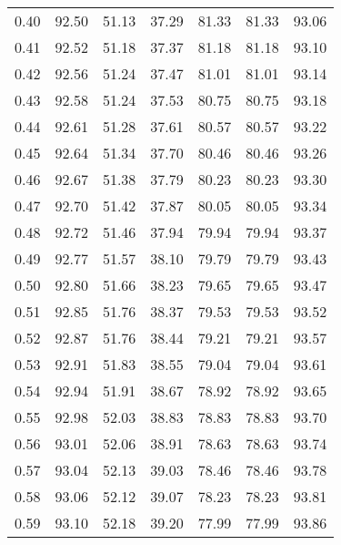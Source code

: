 \begin{tabular}{|c|c|c|c|c|c|c|}
      0.40 &     92.50 &     51.13 &      37.29 &   81.33 &      81.33 &         93.06 \\
      0.41 &     92.52 &     51.18 &      37.37 &   81.18 &      81.18 &         93.10 \\
      0.42 &     92.56 &     51.24 &      37.47 &   81.01 &      81.01 &         93.14 \\
      0.43 &     92.58 &     51.24 &      37.53 &   80.75 &      80.75 &         93.18 \\
      0.44 &     92.61 &     51.28 &      37.61 &   80.57 &      80.57 &         93.22 \\
      0.45 &     92.64 &     51.34 &      37.70 &   80.46 &      80.46 &         93.26 \\
      0.46 &     92.67 &     51.38 &      37.79 &   80.23 &      80.23 &         93.30 \\
      0.47 &     92.70 &     51.42 &      37.87 &   80.05 &      80.05 &         93.34 \\
      0.48 &     92.72 &     51.46 &      37.94 &   79.94 &      79.94 &         93.37 \\
      0.49 &     92.77 &     51.57 &      38.10 &   79.79 &      79.79 &         93.43 \\
      0.50 &     92.80 &     51.66 &      38.23 &   79.65 &      79.65 &         93.47 \\
      0.51 &     92.85 &     51.76 &      38.37 &   79.53 &      79.53 &         93.52 \\
      0.52 &     92.87 &     51.76 &      38.44 &   79.21 &      79.21 &         93.57 \\
      0.53 &     92.91 &     51.83 &      38.55 &   79.04 &      79.04 &         93.61 \\
      0.54 &     92.94 &     51.91 &      38.67 &   78.92 &      78.92 &         93.65 \\
      0.55 &     92.98 &     52.03 &      38.83 &   78.83 &      78.83 &         93.70 \\
      0.56 &     93.01 &     52.06 &      38.91 &   78.63 &      78.63 &         93.74 \\
      0.57 &     93.04 &     52.13 &      39.03 &   78.46 &      78.46 &         93.78 \\
      0.58 &     93.06 &     52.12 &      39.07 &   78.23 &      78.23 &         93.81 \\
      0.59 &     93.10 &     52.18 &      39.20 &   77.99 &      77.99 &         93.86 \\

\end{tabular}
